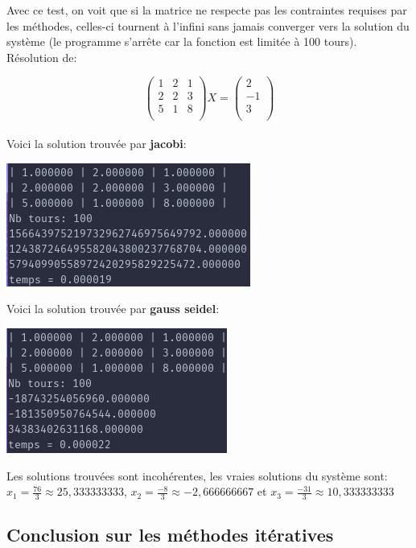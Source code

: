 \documentclass[a4paper]{article}
\begin{document}
Avec ce test, on voit que si la matrice ne respecte pas les contraintes requises
par les méthodes, celles-ci tournent à l'infini sans jamais converger vers la
solution du système (le programme s'arrête car la fonction est limitée à 100 tours).\\

Résolution de:

\[
\begin{pmatrix}
  1 & 2 & 1\\
  2 & 2 & 3\\
  5 & 1 & 8\\
\end{pmatrix} X =
\begin{pmatrix}
  2\\
  -1\\
  3\\
\end{pmatrix}
\]\\

Voici la solution trouvée par \textbf{jacobi}:

\includegraphics[scale=0.5]{./img/jacobi/jac_fail.png}

Voici la solution trouvée par \textbf{gauss seidel}:

\includegraphics[scale=0.5]{./img/gauss_seidel/g_e_fail.png}

Les solutions trouvées sont incohérentes, les vraies solutions du système sont:
$x_{1} = \frac{76}{3} \approx 25,333333333$,
$x_{2} = \frac{-8}{3} \approx -2,666666667$ et
$x_{3} = \frac{-31}{3} \approx 10,333333333$


\subsection{Conclusion sur les méthodes itératives}
\end{document}

